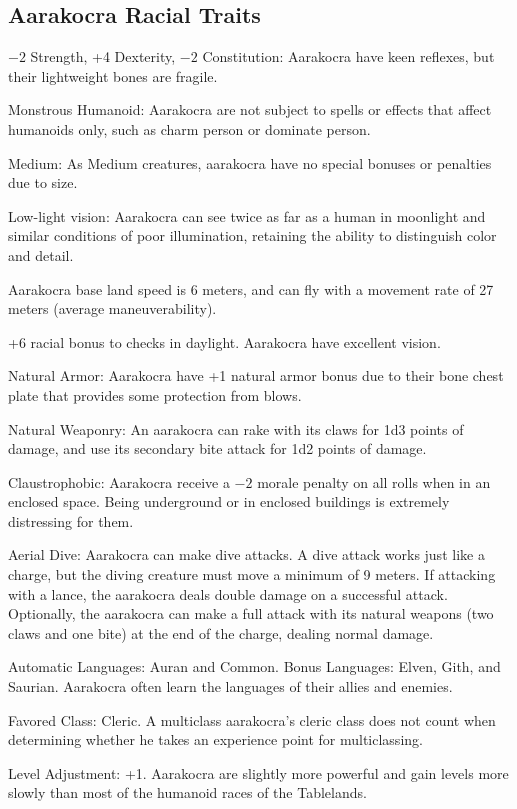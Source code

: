 \subsection{Aarakocra Racial Traits}
\begin{itemize*}
    \item $-2$ Strength, +4 Dexterity, $-2$ Constitution: Aarakocra have keen reflexes, but their lightweight bones are fragile.
    \item Monstrous Humanoid: Aarakocra are not subject to spells or effects that affect humanoids only, such as charm person or dominate person.
    \item Medium: As Medium creatures, aarakocra have no special bonuses or penalties due to size.
    \item Low-light vision: Aarakocra can see twice as far as a human in moonlight and similar conditions of poor illumination, retaining the ability to distinguish color and detail.
    \item Aarakocra base land speed is 6 meters, and can fly with a movement rate of 27 meters (average maneuverability).
    \item +6 racial bonus to  checks in daylight. Aarakocra have excellent vision.
    \item Natural Armor: Aarakocra have +1 natural armor bonus due to their bone chest plate that provides some protection from blows.
    \item Natural Weaponry: An aarakocra can rake with its claws for 1d3 points of damage, and use its secondary bite attack for 1d2 points of damage.
    \item Claustrophobic: Aarakocra receive a $-2$ morale penalty on all rolls when in an enclosed space. Being underground or in enclosed buildings is extremely distressing for them.
    \item Aerial Dive: Aarakocra can make dive attacks. A dive attack works just like a charge, but the diving creature must move a minimum of 9 meters. If attacking with a lance, the aarakocra deals double damage on a successful attack. Optionally, the aarakocra can make a full attack with its natural weapons (two claws and one bite) at the end of the charge, dealing normal damage.
    \item Automatic Languages: Auran and Common. Bonus Languages: Elven, Gith, and Saurian. Aarakocra often learn the languages of their allies and enemies.
    \item Favored Class: Cleric. A multiclass aarakocra's cleric class does not count when determining whether he takes an experience point for multiclassing.
    \item Level Adjustment: +1. Aarakocra are slightly more powerful and gain levels more slowly than most of the humanoid races of the Tablelands.
\end{itemize*}